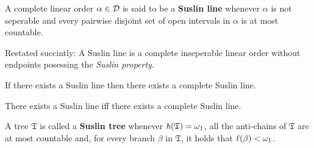 \begin{dfn}
	A complete linear order $\alpha\in\mathcal{D}$ is said to be a \textbf{Suslin line} whenever $\alpha$ is not seperable and every pairwise disjoint set of open intervals in $\alpha$ is at most countable.
\end{dfn}

Restated succintly:  A Suslin line is a complete inseperable linear order without endpoints posessing the \textit{Suslin property}.

\begin{prp}
	If there exists a Suslin line then there exists a complete Suslin line.
\end{prp}

\begin{cor}
	There exists a Suslin line iff there exists a complete Suslin line.
\end{cor}

\begin{dfn}
	A tree $\mathfrak{T}$ is called a \textbf{Suslin tree} whenever $\mathit{h}(\mathfrak{T})=\omega_1$, all the anti-chains of $\mathfrak{T}$ are at most countable and, for every branch $\beta$ in $\mathfrak{T}$, it holds that $\ell(\beta)<\omega_1$.
\end{dfn}

